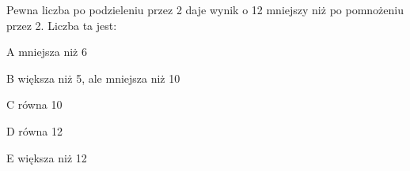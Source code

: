 \begin{tresc}
Pewna liczba po podzieleniu przez 2 daje wynik o 12 mniejszy niż po pomnożeniu przez 2. Liczba ta jest:
\end{tresc}
\begin{wariant}{A} mniejsza niż 6 \end{wariant}
\begin{wariant}{B} większa niż 5, ale mniejsza niż 10 \end{wariant}
\begin{wariant}{C} równa 10 \end{wariant}
\begin{wariant}{D} równa 12 \end{wariant}
\begin{wariant}{E} większa niż 12 \end{wariant}
